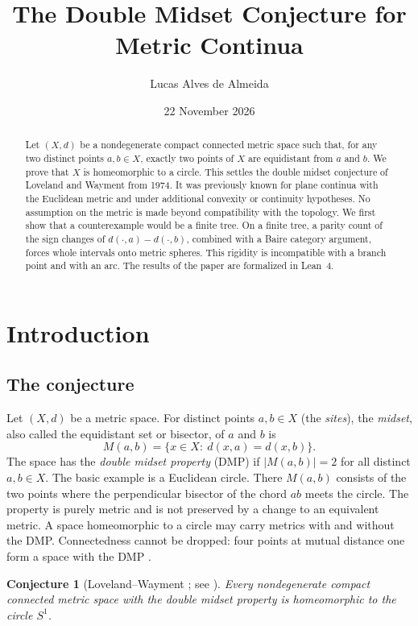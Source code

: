 \documentclass[11pt]{amsart}
\title{The Double Midset Conjecture for Metric Continua}
\author{Lucas Alves de Almeida}
\date{22 November 2026}
\newtheorem{conjecture}[theorem]{Conjecture}
\theoremstyle{definition}
\theoremstyle{remark}
\newcommand{\M}{M}
\begin{document}
\begin{abstract}
Let $(X,d)$ be a nondegenerate compact connected metric space such that, for any two distinct points $a,b\in X$, exactly two points of $X$ are equidistant from $a$ and $b$. We prove that $X$ is homeomorphic to a circle. This settles the double midset conjecture of Loveland and Wayment from 1974. It was previously known for plane continua with the Euclidean metric and under additional convexity or continuity hypotheses. No assumption on the metric is made beyond compatibility with the topology. We first show that a counterexample would be a finite tree. On a finite tree, a parity count of the sign changes of $d(\cdot,a)-d(\cdot,b)$, combined with a Baire category argument, forces whole intervals onto metric spheres. This rigidity is incompatible with a branch point and with an arc. The results of the paper are formalized in Lean~4.
\end{abstract}

\maketitle
\setcounter{tocdepth}{1}
\tableofcontents

\section{Introduction}\label{sec:intro}

\subsection{The conjecture}
Let $(X,d)$ be a metric space. For distinct points $a,b\in X$ (the \emph{sites}), the \emph{midset}, also called the equidistant set or bisector, of $a$ and $b$ is
\[
  \M(a,b)=\{x\in X:\ d(x,a)=d(x,b)\}.
\]
The space has the \emph{double midset property} (DMP) if $|\M(a,b)|=2$ for all distinct $a,b\in X$. The basic example is a Euclidean circle. There $\M(a,b)$ consists of the two points where the perpendicular bisector of the chord $ab$ meets the circle. The property is purely metric and is not preserved by a change to an equivalent metric. A space homeomorphic to a circle may carry metrics with and without the DMP. Connectedness cannot be dropped: four points at mutual distance one form a space with the DMP \cite[p.~347]{L76b}.

\begin{conjecture}[Loveland--Wayment \cite{LW74}; see {\cite[p.~342]{L76b}}]\label{conj:LW}
Every nondegenerate compact connected metric space with the double midset property is homeomorphic to the circle $S^1$.
\end{conjecture}
\end{document}
